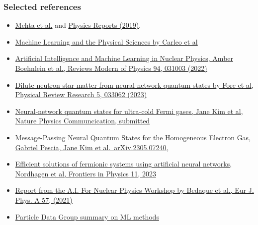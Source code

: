 \documentclass{beamer}
\begin{document}
\begin{frame}
\frametitle{Selected references}

\begin{block}{}
\begin{itemize}
\item \href{{https://arxiv.org/abs/1803.08823}}{Mehta et al.} and \href{{https://www.sciencedirect.com/science/article/pii/S0370157319300766?via%3Dihub}}{Physics Reports (2019)}.

\item \href{{https://link.aps.org/doi/10.1103/RevModPhys.91.045002}}{Machine Learning and the Physical Sciences by Carleo et al}

\item \href{{https://journals.aps.org/rmp/abstract/10.1103/RevModPhys.94.031003}}{Artificial Intelligence and Machine Learning in Nuclear Physics, Amber Boehnlein et al., Reviews Modern of Physics 94, 031003 (2022)} 

\item \href{{https://journals.aps.org/prresearch/pdf/10.1103/PhysRevResearch.5.033062}}{Dilute neutron star matter from neural-network quantum states by Fore et al, Physical Review Research 5, 033062 (2023)}

\item \href{{https://doi.org/10.48550/arXiv.2305.08831}}{Neural-network quantum states for ultra-cold Fermi gases, Jane Kim et al, Nature Physics Communcication, submitted}

\item \href{{https://doi.org/10.48550/arXiv.2305.07240}}{Message-Passing Neural Quantum States for the Homogeneous Electron Gas, Gabriel Pescia, Jane Kim et al.~arXiv.2305.07240,}

\item \href{{https://doi.org/10.3389/fphy.2023.1061580}}{Efficient solutions of fermionic systems using artificial neural networks, Nordhagen et al, Frontiers in Physics 11, 2023}

\item \href{{https://link.springer.com/article/10.1140/epja/s10050-020-00290-x}}{Report from the A.I. For Nuclear Physics  Workshop by Bedaque et al., Eur J. Phys. A 57, (2021)}

\item \href{{https://pdg.lbl.gov/2021/reviews/rpp2021-rev-machine-learning.pdf}}{Particle Data Group summary on ML methods}
\end{itemize}

\noindent
\end{block}
\end{frame}
\end{document}
